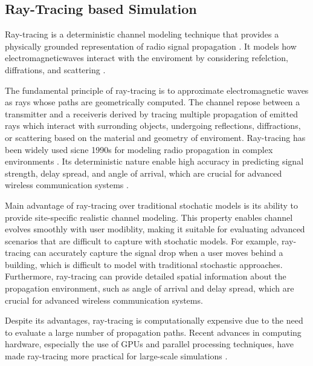 \subsection{Ray-Tracing based Simulation}
Ray-tracing is a deterministic channel modeling technique that provides a physically grounded representation of radio signal propagation \cite{alsamman_mmwave,han_thz}.
It models how electromagneticwaves interact with the enviroment by considering refelction, diffrations, and scattering \cite{alsamman_mmwave,raymobtime_sionna}.

The fundamental principle of ray-tracing is to approximate electromagnetic waves as rays whose paths are geometrically computed.
The channel repose between a transmitter and a receiveris derived by tracing multiple propagation of emitted rays which interact with surronding objects, undergoing reflections, diffractions, or scattering based on the material and geometry of enviroment.
Ray-tracing has been widely used sicne 1990s for modeling radio propagation in complex environments \cite{alsamman_mmwave}.
Its deterministic nature enable high accuracy in predicting signal strength, delay spread, and angle of arrival, which are crucial for advanced wireless communication systems \cite{han_thz,raymobtime_sionna}.

Main advantage of ray-tracing over traditional stochatic models is its ability to provide site-specific realistic channel modeling.
This property enables channel evolves smoothly with user modiblity, making it suitable for evaluating advanced scenarios that are difficult to capture with stochatic models.
For example, ray-tracing can accurately capture the signal drop when a user moves behind a building, which is difficult to model with traditional stochastic approaches.
Furthermore, ray-tracing can provide detailed spatial information about the propagation environment, such as angle of arrival and delay spread, which are crucial for advanced wireless communication systems.

Despite its advantages, ray-tracing is computationally expensive due to the need to evaluate a large number of propagation paths.
Recent advances in computing hardware, especially the use of GPUs and parallel processing techniques, have made ray-tracing more practical for large-scale simulations \cite{sionnart,raymobtime_sionna,cazzella_dt_mimo}.
